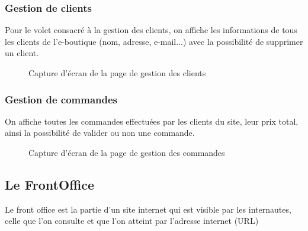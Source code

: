 \subsubsection{Gestion de clients}
Pour le volet consacré à la gestion des clients, on affiche les informations de tous les clients de l'e-boutique (nom, adresse, e-mail...) avec la possibilité de supprimer un client.
\begin{figure}[H]
    \centering
    \caption{Capture d'écran de la page de gestion des clients}
\end{figure}
\newpage
\subsubsection{Gestion de commandes}
On affiche toutes les commandes effectuées par les clients du site, leur prix total, ainsi la possibilité de valider ou non une commande.
\begin{figure}[H]
    \centering
    \caption{Capture d'écran de la page de gestion des commandes}
\end{figure}
\subsection{Le FrontOffice}
Le front office est la partie d'un site internet qui est visible par les internautes, celle que l’on consulte et que l’on atteint par l’adresse internet (URL)
